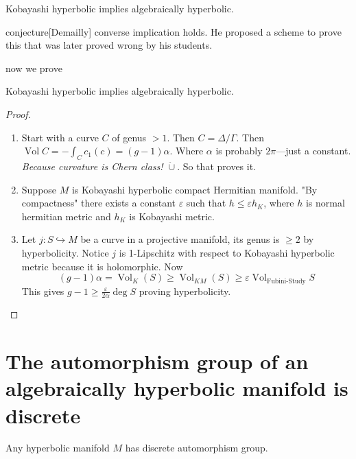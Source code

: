 \begin{thm}[Who?]\leavevmode
Kobayashi hyperbolic implies algebraically hyperbolic.
\end{thm}

\begin{thing4}{conjecture}[Demailly]\leavevmode
	converse implication holds. He proposed a scheme to prove this that was later proved wrong by his students.
\end{thing4}

now we prove

\begin{thm}[Who?]\leavevmode
Kobayashi hyperbolic implies algebraically hyperbolic.
\end{thm}

\begin{proof}\leavevmode
\begin{enumerate}[label=\textbf{Step \arabic*}]
\item Start with a curve $C$ of genus $>1$. Then $C=\Delta/\Gamma$. Then $\operatorname{Vol} C=-\int_{C}c_1(c)=(g-1)\alpha$. Where $\alpha$ is probably $2\pi$---just a constant. \textit{Because curvature is Chern class! $\ddot\cup $}. So that proves it.

\item Suppose $M$ is Kobayashi hyperbolic compact Hermitian manifold. "By compactness" there exists a constant $\varepsilon$ such that $h \leq \varepsilon h_K$, where  $h$ is normal hermitian metric and $h_K$ is Kobayashi metric.

 \item Let $j:S \hookrightarrow M$ be a curve in a projective manifold, its genus is $\geq 2$  by hyperbolicity. Notice $j$ is 1-Lipschitz with respect to Kobayashi hyperbolic metric because it is holomorphic. Now
	 \[(g-1)\alpha=\operatorname{Vol}_{K}(S)\geq \operatorname{Vol}_{KM}(S)\geq \varepsilon\operatorname{Vol}_{\text{Fubini-Study}}S \]
This gives $g-1\geq \frac{\varepsilon}{2 \alpha}\operatorname{deg} S$ proving hyperbolicity. 
\end{enumerate}
\end{proof}

\section{The automorphism group of an algebraically hyperbolic manifold is discrete}

\begin{claim}\leavevmode
	Any hyperbolic manifold $M$ has discrete automorphism group.
\end{claim}

